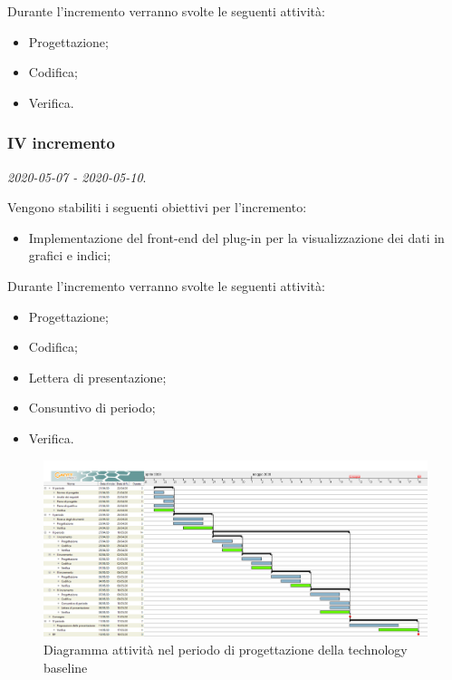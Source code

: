 \documentclass[../piano-di-progetto.tex]{subfiles}
\begin{document}
Durante l'incremento verranno svolte le seguenti attività: 
\begin{itemize}
    \item Progettazione;
    \item Codifica;
    \item Verifica.
\end{itemize}


\subsubsection{IV incremento}
\emph{2020-05-07 - 2020-05-10}. 
 
 Vengono stabiliti i seguenti obiettivi per l'incremento:
 \begin{itemize}
     \item Implementazione del front-end del plug-in per la visualizzazione dei dati in grafici e indici;
 \end{itemize}

Durante l'incremento verranno svolte le seguenti attività: 
\begin{itemize}
    \item Progettazione;
    \item Codifica;
    \item Lettera di presentazione;
    \item Consuntivo di periodo;
    \item Verifica.
\end{itemize}



\newpage
\begin{landscape}
    \begin{figure}[H]
        \centering
        \includegraphics[width=24cm]{img/progettazione.png}
        \caption{Diagramma attività nel periodo di progettazione della technology baseline}
      \end{figure}
\end{landscape}
\end{document}

